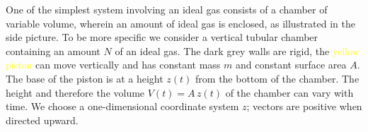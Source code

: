 \documentclass[a4paper,12pt,%
onecolumn,oneside,%
british%
]{memoir}
\renewcommand*{\|}[1][]{\nonscript\:#1\vert\nonscript\:\mathopen{}}
\newcommand*{\yN}{N}
\newcommand*{\ym}{m}%
\begin{document}
One of the simplest system involving an ideal gas consists of a chamber of variable volume, wherein an amount of ideal gas is enclosed, as illustrated in the side picture.
To be more specific we consider a vertical tubular chamber containing an amount $\yN$ of an ideal gas. The \textcolor{midgrey}{dark grey walls} are rigid, the \textcolor{yellow}{yellow piston} can move vertically and has constant mass $\ym$ and constant surface area $A$.
%
%
The base of the piston is at a height $z(t)$ from the bottom of the chamber. The height and therefore the volume $V(t) = A\,z(t)$ of the chamber can vary with time. We choose a one-dimensional coordinate system $z$; vectors are positive when directed upward.
\end{document}
